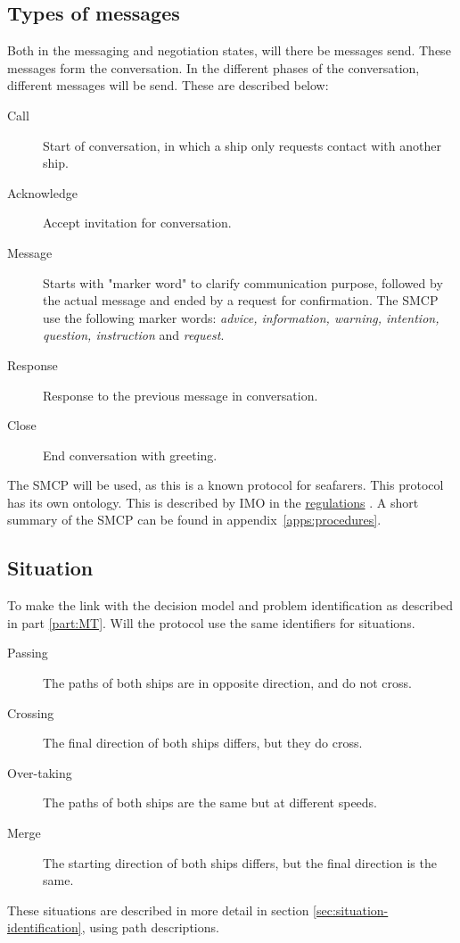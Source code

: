 \subsection{Types of messages}
Both in the messaging and negotiation states, will there be messages send. These messages form the conversation. In the different phases of the conversation, different messages will be send. These are described below:
\begin{description}
	\item [Call] Start of conversation, in which a ship only requests contact with another ship.
	\item [Acknowledge] Accept invitation for conversation.
	\item [Message] Starts with "marker word" to clarify communication purpose, followed by the actual message and ended by a request for confirmation. The \ac{SMCP} use the following marker words: \emph{advice, information, warning, intention, question, instruction} and \emph{request}.
	\item [Response] Response to the previous message in conversation.
	\item [Close] End conversation with greeting.
\end{description}
The \acf{SMCP} will be used, as this is a known protocol for seafarers. This protocol has its own ontology. This is described by \ac{IMO} in the \href{https://puc.overheid.nl/doc/PUC_1418_14/1/#16830}{regulations} \cite{IMO2000}. A short summary of the \ac{SMCP} can be found in appendix~\ref{apps:procedures}.

\subsection{Situation}
To make the link with the decision model and problem identification as described in part \ref{part:MT}. Will the protocol use the same identifiers for situations. 
\begin{description}
	\item [Passing] The paths of both ships are in opposite direction, and do not cross.
	\item [Crossing]The final direction of both ships differs, but they do cross.
	\item [Over-taking] The paths of both ships are the same but at different speeds.
	\item [Merge] The starting direction of both ships differs, but the final direction is the same.
\end{description}
These situations are described in more detail in section \ref{sec:situation-identification}, using path descriptions.
